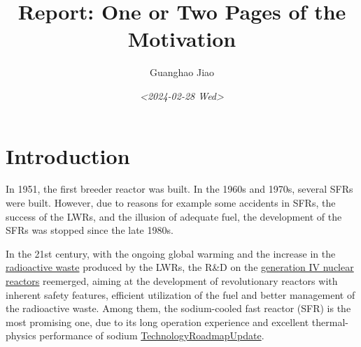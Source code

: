 \documentclass[11pt]{article}
\author{Guanghao Jiao}
\date{\textit{<2024-02-28 Wed>}}
\title{Report: One or Two Pages of the Motivation}
\begin{document}
\maketitle

\section{Introduction}
\label{sec:org9280ff6}
In 1951, the first breeder reactor was built. In the 1960s and 1970s, several SFRs were built. However, due to reasons for example some accidents in SFRs, the success of the LWRs, and the illusion of adequate fuel, the development of the SFRs was stopped since the late 1980s.

In the 21st century, with the ongoing global warming and the increase in the \href{20240203204039-radioactive_waste.org}{radioactive waste} produced by the LWRs, the R\&D on the \href{20240131150544-nuclear_reactor_generation_iv.org}{generation IV nuclear reactors} reemerged, aiming at the development of revolutionary reactors with inherent safety features, efficient utilization of the fuel and better management of the radioactive waste. Among them, the sodium-cooled fast reactor (SFR) is the most promising one, due to its long operation experience and excellent thermal-physics performance of sodium \href{20240229125311-technology_roadmap_update_for_generation_iv_nuclear_energy_systems.org}{TechnologyRoadmapUpdate}.
\cite{TechnologyRoadmapUpdate}

\href{20240302021525-two_dimensional_numerical_simulation_of_single_bubble_rising_behavior_in_liquid_metal_using_moving_particle_semi_implicit_method.org}{\cite{zuoTwodimensionalNumericalSimulation2013}}



\end{document}
